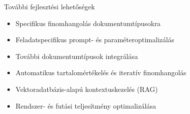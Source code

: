 \documentclass[11pt]{beamer}
\begin{document}
\begin{frame}{További fejlesztési lehetőségek}
    \vspace{-1em}
    \begin{itemize}
        \vspace{1.5em}
        \item[\faCogs] Specifikus finomhangolás dokumentumtípusokra
        \vspace{1.5em}
        \item[\faSlidersH] Feladatspecifikus prompt- és paraméteroptimalizálás
        \vspace{1.5em}
        \item[\faFile] További dokumentumtípusok integrálása
        \vspace{1.5em}
        \item[\faCheckCircle] Automatikus tartalomértékelés és iteratív finomhangolás
        \vspace{1.5em}
        \item[\faDatabase] Vektoradatbázis-alapú kontextuskezelés (\textsc{RAG})
        \vspace{1.5em}
        \item[\faTools] Rendszer- és futási teljesítmény optimalizálása
    \end{itemize}
\end{frame}
\end{document}
